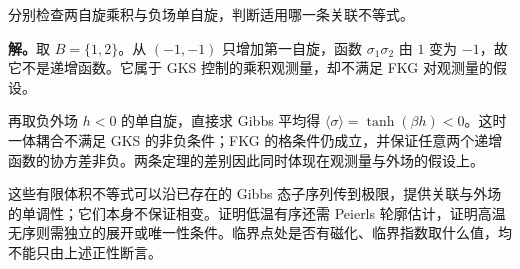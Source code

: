 \begin{workedexample}
分别检查两自旋乘积与负场单自旋，判断适用哪一条关联不等式。

\textbf{解。}取 $B=\{1,2\}$。从 $(-1,-1)$ 只增加第一自旋，函数 $\sigma_1\sigma_2$ 由 $1$ 变为 $-1$，故它不是递增函数。它属于 GKS 控制的乘积观测量，却不满足 FKG 对观测量的假设。

再取负外场 $h<0$ 的单自旋，直接求 Gibbs 平均得 $\langle\sigma\rangle=\tanh(\beta h)<0$。这时一体耦合不满足 GKS 的非负条件；FKG 的格条件仍成立，并保证任意两个递增函数的协方差非负。两条定理的差别因此同时体现在观测量与外场的假设上。
\end{workedexample}

这些有限体积不等式可以沿已存在的 Gibbs 态子序列传到极限，提供关联与外场的单调性；它们本身不保证相变。证明低温有序还需 Peierls 轮廓估计，证明高温无序则需独立的展开或唯一性条件。临界点处是否有磁化、临界指数取什么值，均不能只由上述正性断言。
